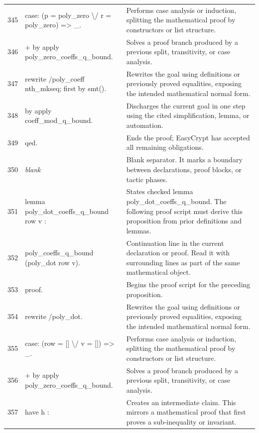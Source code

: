 \documentclass[10pt]{article}
\begin{document}
\begin{longtable}{r L{0.53\textwidth} L{0.37\textwidth}}
345 & {\ttfamily\scriptsize case: (p = poly\_zero \textbackslash{}/ r = poly\_zero) => \_.} & Performs case analysis or induction, splitting the mathematical proof by constructors or list structure. \\
346 & {\ttfamily\scriptsize + by apply poly\_zero\_coeffs\_q\_bound.} & Solves a proof branch produced by a previous split, transitivity, or case analysis. \\
347 & {\ttfamily\scriptsize rewrite /poly\_coeff nth\_mkseq; first by smt().} & Rewrites the goal using definitions or previously proved equalities, exposing the intended mathematical normal form. \\
348 & {\ttfamily\scriptsize by apply coeff\_mod\_q\_bound.} & Discharges the current goal in one step using the cited simplification, lemma, or automation. \\
349 & {\ttfamily\scriptsize qed.} & Ends the proof; EasyCrypt has accepted all remaining obligations. \\
350 & {\ttfamily\scriptsize \emph{blank}} & Blank separator.  It marks a boundary between declarations, proof blocks, or tactic phases. \\
351 & {\ttfamily\scriptsize lemma poly\_dot\_coeffs\_q\_bound row v :} & States checked lemma poly\_dot\_coeffs\_q\_bound.  The following proof script must derive this proposition from prior definitions and lemmas. \\
352 & {\ttfamily\scriptsize   poly\_coeffs\_q\_bound (poly\_dot row v).} & Continuation line in the current declaration or proof.  Read it with surrounding lines as part of the same mathematical object. \\
353 & {\ttfamily\scriptsize proof.} & Begins the proof script for the preceding proposition. \\
354 & {\ttfamily\scriptsize rewrite /poly\_dot.} & Rewrites the goal using definitions or previously proved equalities, exposing the intended mathematical normal form. \\
355 & {\ttfamily\scriptsize case: (row = [] \textbackslash{}/ v = []) => \_.} & Performs case analysis or induction, splitting the mathematical proof by constructors or list structure. \\
356 & {\ttfamily\scriptsize + by apply poly\_zero\_coeffs\_q\_bound.} & Solves a proof branch produced by a previous split, transitivity, or case analysis. \\
357 & {\ttfamily\scriptsize have h :} & Creates an intermediate claim.  This mirrors a mathematical proof that first proves a sub-inequality or invariant. \\

\end{longtable}
\end{document}
